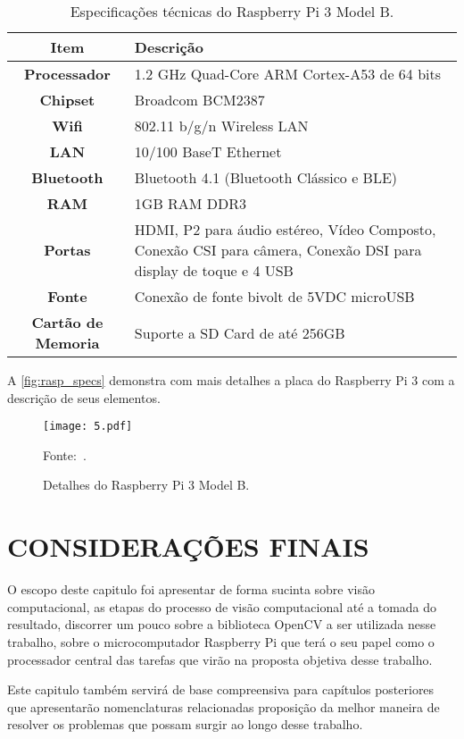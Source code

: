 \begin{table}[htb]
	\ABNTEXfontereduzida
	\caption[\footnotesize Especificações Técnicas do Raspberry Pi 3 Model B.]{\footnotesize Especificações técnicas do Raspberry Pi 3 Model B.}
	\label{tab:rasp_specs}
	\centering
	\begin{tabular}{c|p{11cm}}
		\hline
		\textbf{Item} & \textbf{Descrição} \\
		\hline \hline
		\textbf{Processador} & 1.2 GHz Quad-Core ARM Cortex-A53 de 64 bits\\
		\hline
		\textbf{Chipset} & Broadcom BCM2387 \\
		\hline
		\textbf{Wifi} & 802.11 b/g/n Wireless LAN \\
		\hline
		\textbf{LAN} & 10/100 BaseT Ethernet  \\
		\hline
		\textbf{Bluetooth} & Bluetooth 4.1 (Bluetooth Clássico e BLE) \\ 
		\hline
		\textbf{RAM} & 1GB RAM DDR3 \\
		\hline
		\textbf{Portas} & HDMI, P2 para áudio estéreo, Vídeo Composto, Conexão CSI para câmera, Conexão DSI para display de toque e 4 USB \\
		\hline
		\textbf{Fonte} & Conexão de fonte bivolt de 5VDC microUSB \\
		\hline
		\textbf{Cartão de Memoria} & Suporte a SD Card de até 256GB \\
		\hline \hline
	\end{tabular}
\end{table} 

A \autoref{fig:rasp_specs} demonstra com mais detalhes a placa do Raspberry Pi 3 com a descrição de seus elementos.

\begin{figure}[htb]
	\centering
	\caption{{\footnotesize Detalhes do Raspberry Pi 3 Model B.}}   %
	\label{fig:rasp_specs}
	\texttt{[image: 5.pdf]}
	
	{\footnotesize Fonte:~.}
\end{figure}

\section{\uppercase{Considerações Finais}}

O escopo deste capitulo foi apresentar de forma sucinta sobre visão computacional, as etapas do processo de visão computacional até a tomada do resultado, discorrer um pouco sobre a biblioteca OpenCV a ser utilizada nesse trabalho, sobre o microcomputador Raspberry Pi que terá o seu papel como o processador central das tarefas que virão na proposta objetiva desse trabalho.

Este capitulo também servirá de base compreensiva para capítulos posteriores que apresentarão nomenclaturas relacionadas proposição da melhor maneira de resolver os problemas que possam surgir ao longo desse trabalho.
